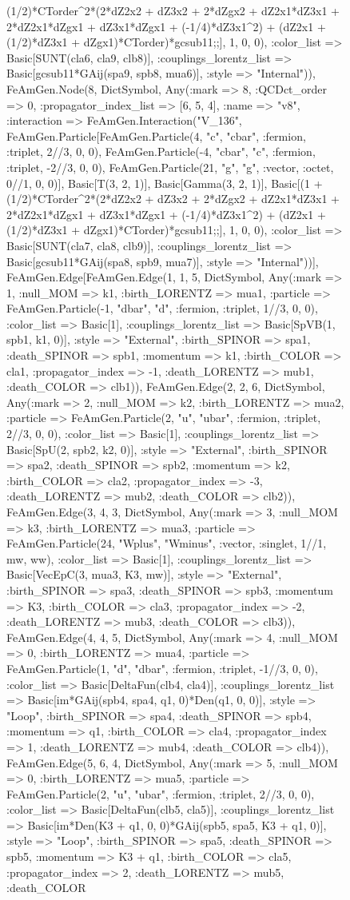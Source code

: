 \documentclass{revtex4}
\begin{document}
\begin{figure}[!htb]
\begin{center}
{(1/2)*CTorder^2*(2*dZ2x2 + dZ3x2 + 2*dZgx2 + dZ2x1*dZ3x1 + 2*dZ2x1*dZgx1 + dZ3x1*dZgx1 + (-1/4)*dZ3x1^2) + (dZ2x1 + (1/2)*dZ3x1 + dZgx1)*CTorder)*gcsub11;;], 1, 0, 0), :color_list => Basic[SUNT(cla6, cla9, clb8)], :couplings_lorentz_list => Basic[gcsub11*GAij(spa9, spb8, mua6)], :style => "Internal")), FeAmGen.Node(8, Dict{Symbol, Any}(:mark => 8, :QCDct_order => 0, :propagator_index_list => [6, 5, 4], :name => "v8", :interaction => FeAmGen.Interaction("V_136", FeAmGen.Particle[FeAmGen.Particle(4, "c", "cbar", :fermion, :triplet, 2//3, 0, 0), FeAmGen.Particle(-4, "cbar", "c", :fermion, :triplet, -2//3, 0, 0), FeAmGen.Particle(21, "g", "g", :vector, :octet, 0//1, 0, 0)], Basic[T(3, 2, 1)], Basic[Gamma(3, 2, 1)], Basic[(1 + (1/2)*CTorder^2*(2*dZ2x2 + dZ3x2 + 2*dZgx2 + dZ2x1*dZ3x1 + 2*dZ2x1*dZgx1 + dZ3x1*dZgx1 + (-1/4)*dZ3x1^2) + (dZ2x1 + (1/2)*dZ3x1 + dZgx1)*CTorder)*gcsub11;;], 1, 0, 0), :color_list => Basic[SUNT(cla7, cla8, clb9)], :couplings_lorentz_list => Basic[gcsub11*GAij(spa8, spb9, mua7)], :style => "Internal"))], FeAmGen.Edge[FeAmGen.Edge(1, 1, 5, Dict{Symbol, Any}(:mark => 1, :null_MOM => k1, :birth_LORENTZ => mua1, :particle => FeAmGen.Particle(-1, "dbar", "d", :fermion, :triplet, 1//3, 0, 0), :color_list => Basic[1], :couplings_lorentz_list => Basic[SpVB(1, spb1, k1, 0)], :style => "External", :birth_SPINOR => spa1, :death_SPINOR => spb1, :momentum => k1, :birth_COLOR => cla1, :propagator_index => -1, :death_LORENTZ => mub1, :death_COLOR => clb1)), FeAmGen.Edge(2, 2, 6, Dict{Symbol, Any}(:mark => 2, :null_MOM => k2, :birth_LORENTZ => mua2, :particle => FeAmGen.Particle(2, "u", "ubar", :fermion, :triplet, 2//3, 0, 0), :color_list => Basic[1], :couplings_lorentz_list => Basic[SpU(2, spb2, k2, 0)], :style => "External", :birth_SPINOR => spa2, :death_SPINOR => spb2, :momentum => k2, :birth_COLOR => cla2, :propagator_index => -3, :death_LORENTZ => mub2, :death_COLOR => clb2)), FeAmGen.Edge(3, 4, 3, Dict{Symbol, Any}(:mark => 3, :null_MOM => k3, :birth_LORENTZ => mua3, :particle => FeAmGen.Particle(24, "Wplus", "Wminus", :vector, :singlet, 1//1, mw, ww), :color_list => Basic[1], :couplings_lorentz_list => Basic[VecEpC(3, mua3, K3, mw)], :style => "External", :birth_SPINOR => spa3, :death_SPINOR => spb3, :momentum => K3, :birth_COLOR => cla3, :propagator_index => -2, :death_LORENTZ => mub3, :death_COLOR => clb3)), FeAmGen.Edge(4, 4, 5, Dict{Symbol, Any}(:mark => 4, :null_MOM => 0, :birth_LORENTZ => mua4, :particle => FeAmGen.Particle(1, "d", "dbar", :fermion, :triplet, -1//3, 0, 0), :color_list => Basic[DeltaFun(clb4, cla4)], :couplings_lorentz_list => Basic[im*GAij(spb4, spa4, q1, 0)*Den(q1, 0, 0)], :style => "Loop", :birth_SPINOR => spa4, :death_SPINOR => spb4, :momentum => q1, :birth_COLOR => cla4, :propagator_index => 1, :death_LORENTZ => mub4, :death_COLOR => clb4)), FeAmGen.Edge(5, 6, 4, Dict{Symbol, Any}(:mark => 5, :null_MOM => 0, :birth_LORENTZ => mua5, :particle => FeAmGen.Particle(2, "u", "ubar", :fermion, :triplet, 2//3, 0, 0), :color_list => Basic[DeltaFun(clb5, cla5)], :couplings_lorentz_list => Basic[im*Den(K3 + q1, 0, 0)*GAij(spb5, spa5, K3 + q1, 0)], :style => "Loop", :birth_SPINOR => spa5, :death_SPINOR => spb5, :momentum => K3 + q1, :birth_COLOR => cla5, :propagator_index => 2, :death_LORENTZ => mub5, :death_COLOR }
\end{center}
\end{figure}
\end{document}
